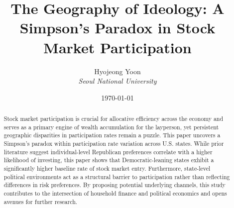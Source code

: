 \documentclass[12pt, a4paper]{article}
\title{\textbf{
    The Geography of Ideology: A Simpson’s Paradox in Stock Market Participation
}}
\author{
    Hyojeong Yoon \\
    \textit{Seoul National University}
}
\date{\today}
\begin{document}

\maketitle

\begin{abstract}
    \noindent Stock market participation is crucial for allocative efficiency across the economy and serves as a primary engine of wealth accumulation for the layperson, yet persistent geographic disparities in participation rates remain a puzzle. This paper uncovers a Simpson’s paradox within participation rate variation across U.S. states. While prior literature suggest individual-level Republican preferences correlate with a higher likelihood of investing, this paper shows that Democratic-leaning states exhibit a significantly higher baseline rate of stock market entry. Furthermore, state-level political environments act as a structural barrier to participation rather than reflecting differences in risk preferences. By proposing potential underlying channels, this study contributes to the intersection of household finance and political economics and opens avenues for further research.

\end{abstract}

\thispagestyle{empty} %
\newpage
{} 









\newpage
\printbibliography

\newpage
\begin{appendices}


\end{appendices}
\end{document}
